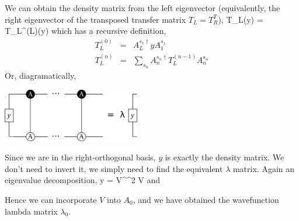 \documentclass{article}[10pt]
\begin{document}
We can obtain the density matrix from the left eigenvector
(equivalently, the right eigenvector of the transposed transfer matrix $T_L = T_R^T$),
\beq
T_L(y) = T_L^{(L)}(y)
\eeq
which has a recursive definition,
\begin{eqnarray}
T_L^{(0)} &=&  A^{s_1\dagger}_L y A^{s_1}_1 \\
T_L^{(n)} &=& \sum_{s_n}  A^{s_n\dagger}_n T_L^{(n-1)} A^{s_n}_n
\end{eqnarray}
Or, diagramatically,

\begin{centering}
\includegraphics[width=6cm]{TransferLeft.pdf}\par
\end{centering}

Since we are in the right-orthogonal basis, $y$ is exactly the density matrix. We don't need to invert it,
we simply need to find the equivalent $\lambda$ matrix. Again an eigenvalue decomposition,
\beq
y = V^\dagger \lambda^2 V
\eeq
and 

Hence we can incorporate $V$ into $A_0$, and we have obtained the wavefunction lambda matrix $\lambda_0$.
\end{document}
